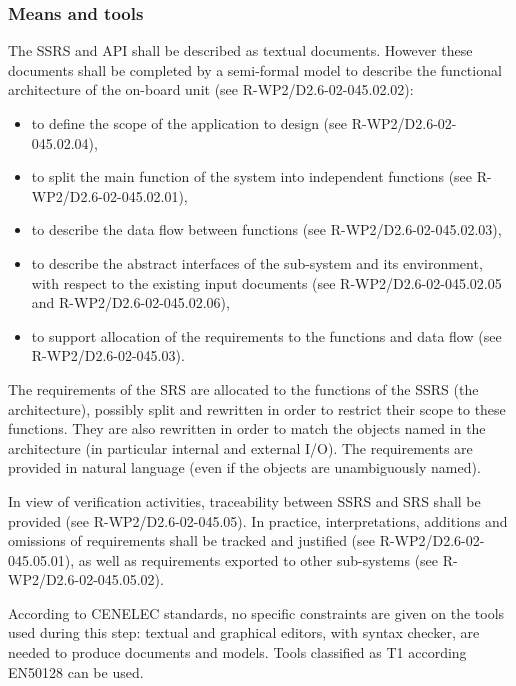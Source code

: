 \subsubsection{Means and tools}

The SSRS and API shall be described as textual documents.
However these documents shall be completed by a semi-formal model to describe the functional architecture of the on-board unit (see R-WP2/D2.6-02-045.02.02):

\begin{itemize}
\item to  define the scope of the application to design (see R-WP2/D2.6-02-045.02.04),
\item to split the main function of the system into independent functions (see R-WP2/D2.6-02-045.02.01),
\item to describe the data flow between functions (see R-WP2/D2.6-02-045.02.03),
\item to describe the abstract interfaces of the sub-system and its environment, with respect to the existing input documents (see R-WP2/D2.6-02-045.02.05 and R-WP2/D2.6-02-045.02.06),
\item to  support allocation of the requirements to  the functions and data flow (see R-WP2/D2.6-02-045.03).
\end{itemize}

The requirements of the SRS are allocated to the
functions of the SSRS (the architecture), possibly split and rewritten in order to restrict their scope to these
functions. They are also rewritten in order to match the objects named in
the architecture (in particular internal and external I/O). The requirements are provided in natural language
(even if the objects are unambiguously named).

In view of verification activities, traceability between SSRS and SRS shall be provided (see R-WP2/D2.6-02-045.05). In practice, interpretations, additions and omissions of requirements shall be tracked and justified (see R-WP2/D2.6-02-045.05.01), as well as requirements exported to other sub-systems (see R-WP2/D2.6-02-045.05.02).

According to  CENELEC standards, no specific constraints are given on the tools used during this step: textual and graphical editors, with syntax checker, are needed to  produce documents and models. Tools classified as T1 according EN50128 can be used.


